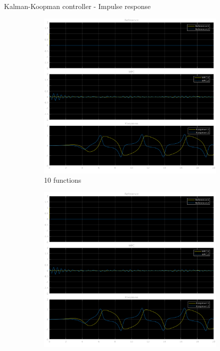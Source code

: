 \documentclass{beamer}
\begin{document}
\begin{frame}{Kalman-Koopman controller - Impulse response}
    \begin{figure}
        \centering
        \begin{subfigure}[b]{0.3\textwidth}
            \centering
            \includegraphics[width=\textwidth]{KK_10_Pulse.png}
            \caption{10 functions}
        \end{subfigure}
        \hfill
        \begin{subfigure}[b]{0.3\textwidth}
            \centering
            \includegraphics[width=\textwidth]{KK_20_Pulse.png}

\end{subfigure}
\end{figure}
\end{frame}
\end{document}
